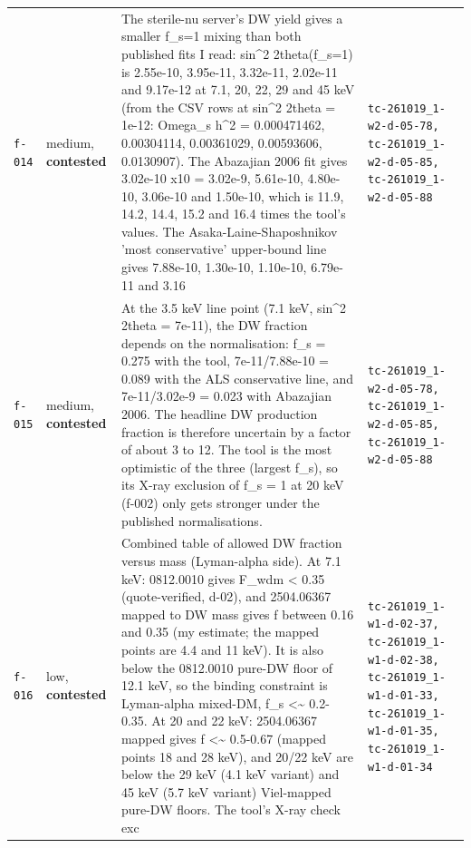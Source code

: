 \documentclass[11pt,a4paper]{article}
\begin{document}
\begin{longtable}{@{}p{}p{}p{}p{}@{}}
\texttt{f-014} & medium, \textbf{contested} & The sterile-nu server's DW yield gives a smaller f\_s=1 mixing than both published fits I read: sin\textasciicircum{}2 2theta(f\_s=1) is 2.55e-10, 3.95e-11, 3.32e-11, 2.02e-11 and 9.17e-12 at 7.1, 20, 22, 29 and 45 keV (from the CSV rows at sin\textasciicircum{}2 2theta = 1e-12: Omega\_s h\textasciicircum{}2 = 0.000471462, 0.00304114, 0.00361029, 0.00593606, 0.0130907). The Abazajian 2006 fit gives 3.02e-10 x10 = 3.02e-9, 5.61e-10, 4.80e-10, 3.06e-10 and 1.50e-10, which is 11.9, 14.2, 14.4, 15.2 and 16.4 times the tool's values. The Asaka-Laine-Shaposhnikov 'most conservative' upper-bound line gives 7.88e-10, 1.30e-10, 1.10e-10, 6.79e-11 and 3.16 & \texttt{tc-261019\_\allowbreak{}1-w2-d-05-78,\allowbreak{} tc-261019\_\allowbreak{}1-w2-d-05-85,\allowbreak{} tc-261019\_\allowbreak{}1-w2-d-05-88} \\
\texttt{f-015} & medium, \textbf{contested} & At the 3.5 keV line point (7.1 keV, sin\textasciicircum{}2 2theta = 7e-11), the DW fraction depends on the normalisation: f\_s = 0.275 with the tool, 7e-11/7.88e-10 = 0.089 with the ALS conservative line, and 7e-11/3.02e-9 = 0.023 with Abazajian 2006. The headline DW production fraction is therefore uncertain by a factor of about 3 to 12. The tool is the most optimistic of the three (largest f\_s), so its X-ray exclusion of f\_s = 1 at 20 keV (f-002) only gets stronger under the published normalisations. & \texttt{tc-261019\_\allowbreak{}1-w2-d-05-78,\allowbreak{} tc-261019\_\allowbreak{}1-w2-d-05-85,\allowbreak{} tc-261019\_\allowbreak{}1-w2-d-05-88} \\
\texttt{f-016} & low, \textbf{contested} & Combined table of allowed DW fraction versus mass (Lyman-alpha side). At 7.1 keV: 0812.0010 gives F\_wdm \textless{} 0.35 (quote-verified, d-02), and 2504.06367 mapped to DW mass gives f between 0.16 and 0.35 (my estimate; the mapped points are 4.4 and 11 keV). It is also below the 0812.0010 pure-DW floor of 12.1 keV, so the binding constraint is Lyman-alpha mixed-DM, f\_s \textless{}\textasciitilde{} 0.2-0.35. At 20 and 22 keV: 2504.06367 mapped gives f \textless{}\textasciitilde{} 0.5-0.67 (mapped points 18 and 28 keV), and 20/22 keV are below the 29 keV (4.1 keV variant) and 45 keV (5.7 keV variant) Viel-mapped pure-DW floors. The tool's X-ray check exc & \texttt{tc-261019\_\allowbreak{}1-w1-d-02-37,\allowbreak{} tc-261019\_\allowbreak{}1-w1-d-02-38,\allowbreak{} tc-261019\_\allowbreak{}1-w1-d-01-33,\allowbreak{} tc-261019\_\allowbreak{}1-w1-d-01-35,\allowbreak{} tc-261019\_\allowbreak{}1-w1-d-01-34} \\

\end{longtable}
\end{document}
